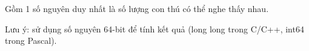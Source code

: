 Gồm 1 số nguyên duy nhất là số lượng con thú có thể nghe thấy nhau.  

   Lưu ý: sử dụng số nguyên 64-bit để tính kết quả (long long trong C/C++, int64 trong Pascal).